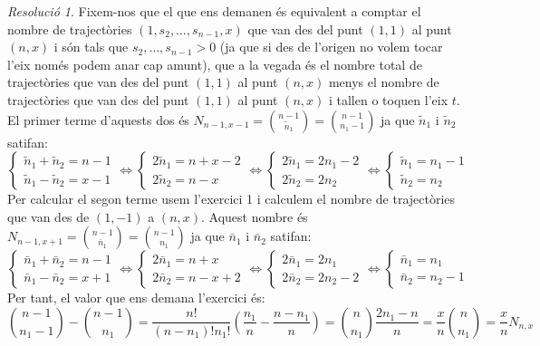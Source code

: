 \documentclass[10pt,a4paper]{article}
\theoremstyle{definition}
\theoremstyle{remark}
\newtheorem*{res}{Resolució}
\begin{document}
\begin{res}
  Fixem-nos que el que ens demanen és equivalent a comptar el nombre de trajectòries $(1,s_2,\ldots,s_{n-1},x)$ que van des del punt $(1,1)$ al punt $(n,x)$ i són tals que $s_2,\ldots,s_{n-1}>0$ (ja que si des de l'origen no volem tocar l'eix només podem anar cap amunt), que a la vegada és el nombre total de trajectòries que van des del punt $(1,1)$ al punt $(n,x)$ menys el nombre de trajectòries que van des del punt $(1,1)$ al punt $(n,x)$ i tallen o toquen l'eix $t$. El primer terme d'aquests dos és $N_{n-1,x-1}=\binom{n-1}{\tilde{n}_1}=\binom{n-1}{n_1-1}$ ja que $\tilde{n}_1$ i $\tilde{n}_2$ satifan:
  $$
    \begin{cases}
      \tilde{n}_1+\tilde{n}_2=n-1 \\
      \tilde{n}_1-\tilde{n}_2=x-1
    \end{cases}\iff
    \begin{cases}
      2\tilde{n}_1=n+x-2 \\
      2\tilde{n}_2=n-x
    \end{cases}
    \iff
    \begin{cases}
      2\tilde{n}_1=2n_1-2 \\
      2\tilde{n}_2=2n_2
    \end{cases}
    \iff
    \begin{cases}
      \tilde{n}_1=n_1-1 \\
      \tilde{n}_2=n_2
    \end{cases}
  $$
  Per calcular el segon terme usem l'exercici 1 i calculem el nombre de trajectòries que van des de $(1,-1)$ a $(n,x)$. Aquest nombre és $N_{n-1,x+1}=\binom{n-1}{\bar{n}_1}=\binom{n-1}{n_1}$ ja que $\bar{n}_1$ i $\bar{n}_2$ satifan:
  $$
    \begin{cases}
      \bar{n}_1+\bar{n}_2=n-1 \\
      \bar{n}_1-\bar{n}_2=x+1
    \end{cases}\iff
    \begin{cases}
      2\bar{n}_1=n+x \\
      2\bar{n}_2=n-x+2
    \end{cases}
    \iff
    \begin{cases}
      2\bar{n}_1=2n_1 \\
      2\bar{n}_2=2n_2-2
    \end{cases}
    \iff
    \begin{cases}
      \bar{n}_1=n_1 \\
      \bar{n}_2=n_2-1
    \end{cases}
  $$
  Per tant, el valor que ens demana l'exercici és:
  $$\binom{n-1}{n_1-1}-\binom{n-1}{n_1}=\frac{n!}{(n-n_1)!n_1!}\left(\frac{n_1}{n}-\frac{n-n_1}{n}\right)=\binom{n}{n_1}\frac{2n_1-n}{n}=\frac{x}{n}\binom{n}{n_1}=\frac{x}{n}N_{n,x}$$


\end{res}
\end{document}
